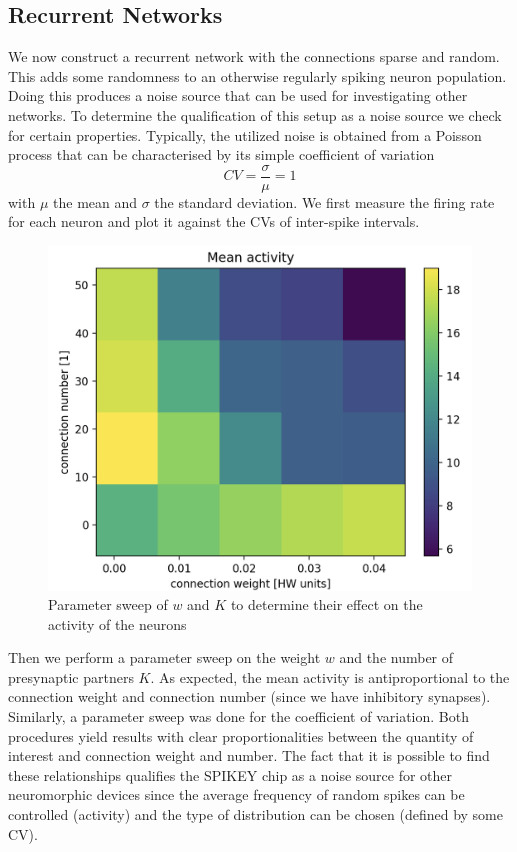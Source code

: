 \documentclass[a4paper,twocolumn]{article}
\begin{document}
\subsection{Recurrent Networks}
We now construct a recurrent network with the connections sparse and random.
This adds some randomness to an otherwise regularly spiking neuron population.
Doing this produces a noise source that can be used for investigating other networks.
To determine the qualification of this setup as a noise source we check for certain
properties.  Typically,  the utilized noise is obtained from a Poisson process
that can be characterised by its simple coefficient of variation
\begin{equation}
	CV = \frac{\sigma}{\mu} = 1
\end{equation}
with $\mu$ the mean and $\sigma$ the standard deviation. We first measure the
firing rate for each neuron and plot it against the CVs of inter-spike intervals.
\begin{figure}[ht]
    \centering
    \includegraphics[width=.5\textwidth]{figures/activity_sweep.png}
    \caption{Parameter sweep of $w$ and $K$ to determine their effect on the activity of the neurons}
    \label{fig:activity_sweep}
\end{figure}
Then we perform a parameter sweep on the weight $w$ and the number of presynaptic
partners $K$.  As expected, the mean activity is antiproportional to the connection weight 
and connection number (since we have inhibitory synapses).  Similarly,  a parameter sweep 
was done for the coefficient of variation.  Both procedures yield results with clear proportionalities
between the quantity of interest and connection weight and number.  The fact that it is possible 
to find these relationships qualifies the SPIKEY chip as a noise source for other neuromorphic 
devices since the average frequency of random spikes can be controlled (activity) and the type 
of distribution can be chosen (defined by some CV).
\end{document}
